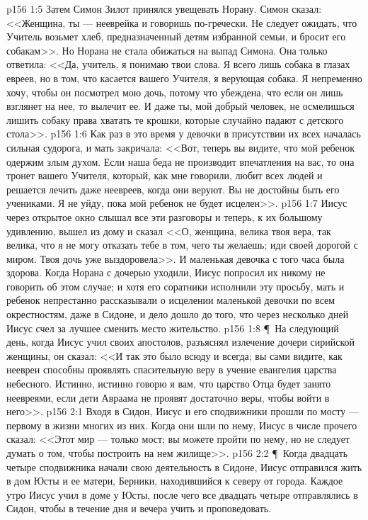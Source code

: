 \vs p156 1:5 Затем Симон Зилот принялся увещевать Норану. Симон сказал: <<Женщина, ты --- нееврейка и говоришь по\hyp{}гречески. Не следует ожидать, что Учитель возьмет хлеб, предназначенный детям избранной семьи, и бросит его собакам>>. Но Норана не стала обижаться на выпад Симона. Она только ответила: <<Да, учитель, я понимаю твои слова. Я всего лишь собака в глазах евреев, но в том, что касается вашего Учителя, я верующая собака. Я непременно хочу, чтобы он посмотрел мою дочь, потому что убеждена, что если он лишь взглянет на нее, то вылечит ее. И даже ты, мой добрый человек, не осмелишься лишить собаку права хватать те крошки, которые случайно падают с детского стола>>.
\vs p156 1:6 Как раз в это время у девочки в присутствии их всех началась сильная судорога, и мать закричала: <<Вот, теперь вы видите, что мой ребенок одержим злым духом. Если наша беда не производит впечатления на вас, то она тронет вашего Учителя, который, как мне говорили, любит всех людей и решается лечить даже неевреев, когда они веруют. Вы не достойны быть его учениками. Я не уйду, пока мой ребенок не будет исцелен>>.
\vs p156 1:7 Иисус через открытое окно слышал все эти разговоры и теперь, к их большому удивлению, вышел из дому и сказал <<О, женщина, велика твоя вера, так велика, что я не могу отказать тебе в том, чего ты желаешь; иди своей дорогой с миром. Твоя дочь уже выздоровела>>. И маленькая девочка с того часа была здорова. Когда Норана с дочерью уходили, Иисус попросил их никому не говорить об этом случае; и хотя его соратники исполнили эту просьбу, мать и ребенок непрестанно рассказывали о исцелении маленькой девочки по всем окрестностям, даже в Сидоне, и дело дошло до того, что через несколько дней Иисус счел за лучшее сменить место жительство.
\vs p156 1:8 \P\ На следующий день, когда Иисус учил своих апостолов, разъяснял излечение дочери сирийской женщины, он сказал: <<И так это было всюду и всегда; вы сами видите, как неевреи способны проявлять спасительную веру в учение евангелия царства небесного. Истинно, истинно говорю я вам, что царство Отца будет занято неевреями, если дети Авраама не проявят достаточно веры, чтобы войти в него>>.
\vs p156 2:1 Входя в Сидон, Иисус и его сподвижники прошли по мосту --- первому в жизни многих из них. Когда они шли по нему, Иисус в числе прочего сказал: <<Этот мир --- только мост; вы можете пройти по нему, но не следует думать о том, чтобы построить на нем жилище>>.
\vs p156 2:2 \P\ Когда двадцать четыре сподвижника начали свою деятельность в Сидоне, Иисус отправился жить в дом Юсты и ее матери, Берники, находившийся к северу от города. Каждое утро Иисус учил в доме у Юсты, после чего все двадцать четыре отправлялись в Сидон, чтобы в течение дня и вечера учить и проповедовать.
